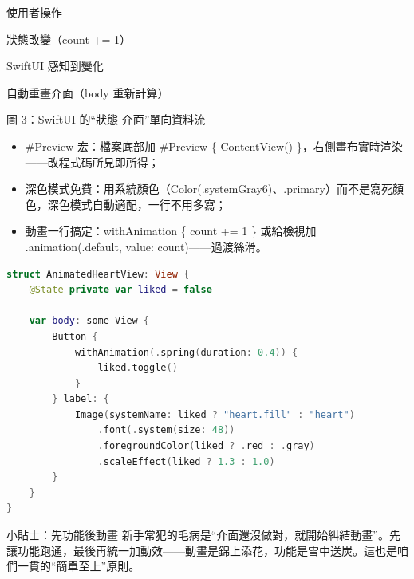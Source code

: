 使用者操作

狀態改變（count += 1）

SwiftUI 感知到變化

自動重畫介面（body 重新計算）

\begin{center}\small\color{gray}圖 3：SwiftUI 的“狀態 介面”單向資料流\end{center}


\begin{itemize}
  \item \#Preview 宏：檔案底部加 \#Preview \{ ContentView() \}，右側畫布實時渲染——改程式碼所見即所得；
  \item 深色模式免費：用系統顏色（Color(.systemGray6)、.primary）而不是寫死顏色，深色模式自動適配，一行不用多寫；
  \item 動畫一行搞定：withAnimation \{ count += 1 \} 或給檢視加 .animation(.default, value: count)——過渡絲滑。
\end{itemize}

\begin{lstlisting}[language=Swift]
struct AnimatedHeartView: View {
    @State private var liked = false

    var body: some View {
        Button {
            withAnimation(.spring(duration: 0.4)) {
                liked.toggle()
            }
        } label: {
            Image(systemName: liked ? "heart.fill" : "heart")
                .font(.system(size: 48))
                .foregroundColor(liked ? .red : .gray)
                .scaleEffect(liked ? 1.3 : 1.0)
        }
    }
}
\end{lstlisting}

\begin{tcbinfo}{小貼士：先功能後動畫}
新手常犯的毛病是“介面還沒做對，就開始糾結動畫”。先讓功能跑通，最後再統一加動效——動畫是錦上添花，功能是雪中送炭。這也是咱們一貫的“簡單至上”原則。

\end{tcbinfo}

